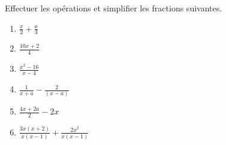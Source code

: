 
\begin{exercice}\label{exosmath-0471}

    Effectuer les opérations et simplifier les fractions suivantes.
    \begin{multicols}{3}
        \begin{enumerate}
            \item
                \( \frac{ x }{ 2 }+\frac{ a }{ 3 }\)
            \item
                \( \frac{ 10x+2 }{ 4 }\)
            \item
                \( \frac{ x^2-16 }{ x-4 }\)
            \item
                \( \frac{1}{ x+a }-\frac{ 2 }{ (x-a) }\)
            \item
                \( \frac{ 4x+2a }{ 2 }-2x\)
            \item
                \( \frac{ 3x(x+2) }{ x(x-1) }+\frac{ 2x^2 }{ x(x-1) }\)
        \end{enumerate}
    \end{multicols}

\end{exercice}
